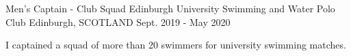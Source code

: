 \begin{cventries}
  \cventry
    {Men's Captain - Club Squad} %
    {Edinburgh University Swimming and Water Polo Club} %
    {Edinburgh, SCOTLAND} %
    {Sept. 2019 - May 2020} %
    {
      \begin{cvitems} %
        \item I captained a squad of more than 20 swimmers for university swimming matches.
      \end{cvitems}
    }
    \vspace{.08cm}
\end{cventries}

